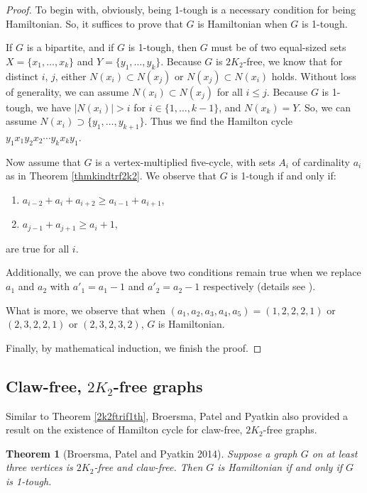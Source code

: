 \documentclass[12pt]{report}
\newtheorem{theorem}{Theorem}
\begin{document}
\begin{proof}
To begin with, obviously, being 1-tough is a necessary condition for being Hamiltonian. So, it suffices to prove that $G$ is Hamiltonian when $G$ is 1-tough.

If $G$ is a bipartite, and if $G$ is 1-tough, then $G$ must be of two equal-sized sets $X=\{x_1,\ldots,x_k\}$ and $Y=\{y_1,\ldots,y_k\}$. Because $G$ is $2K_2$-free, we know that for distinct $i$, $j$, either $N(x_i)\subset N(x_j)$ or $N(x_j)\subset N(x_i)$ holds. Without loss of generality, we can assume $N(x_i)\subset N(x_j)$ for all $i\le j$. Because $G$ is 1-tough, we have $|N(x_i)|>i$ for $i\in\{1,\ldots,k-1\}$, and $N(x_k)=Y$. So, we can assume $N(x_i)\supset\{y_1,\ldots,y_{k+1}\}$. Thus we find the Hamilton cycle $y_1x_1y_2x_2\cdots y_kx_ky_1$.

Now assume that $G$ is a vertex-multiplied five-cycle, with sets $A_i$ of cardinality $a_i$ as in Theorem \ref{thmkindtrf2k2}.
We observe that $G$ is 1-tough if and only if:
\begin{enumerate}
\item $a_{i-2}+a_i+a_{i+2}\ge a_{i-1}+a_{i+1}$,
\item $a_{j-1}+a_{j+1}\ge a_i+1$,
\end{enumerate}
are true for all $i$.

Additionally, we can prove the above two conditions remain true when we replace $a_1$ and $a_2$ with $a'_1=a_1-1$ and $a'_2=a_2-1$ respectively (details see \cite[Theorem 4]{broersma2014toughness}). 

What is more, we observe that when $(a_1,a_2,a_3,a_4,a_5)=(1,2,2,2,1)$ or $(2,3,2,2,1)$ or $(2,3,2,3,2)$, $G$ is Hamiltonian.

Finally, by mathematical induction, we finish the proof.




\end{proof}








\subsection{Claw-free, $2K_2$-free graphs}

Similar to Theorem \ref{2k2ftrif1th}, Broersma, Patel and Pyatkin also provided a result on the existence of Hamilton cycle for claw-free, $2K_2$-free graphs.

\begin{theorem}[Broersma, Patel and Pyatkin 2014]\label{2k2fclf1thth}
Suppose a graph $G$ on at least three vertices is $2K_2$-free and claw-free. Then $G$ is Hamiltonian if and only if $G$ is 1-tough.
\end{theorem}
\end{document}

